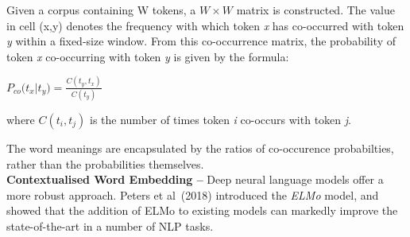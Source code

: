 \documentclass[12pt,a4paper]{article}
\begin{document}
Given a corpus containing W tokens, a $W \times W$ matrix is constructed. The value in cell (x,y) denotes the frequency with which token \textit{x} has co-occurred with token \textit{y} within a fixed-size window. From this co-occurrence matrix, the probability of token \textit{x} co-occurring with token \textit{y} is given by the formula: \begin{center}
	$P_{co}\bigl( t_x | t_y\bigr) = \frac{C(t_y, t_x)}{C(t_y)}$
\end{center}
where $C(t_i, t_j)$ is the number of times token \textit{i} co-occurs with token \textit{j}.

The word meanings are encapsulated by the ratios of co-occurence probabilties, rather than the probabilities themselves.\\
\newpage
\noindent \textbf{Contextualised Word Embedding --}
Deep neural language models offer a more robust approach. Peters et al\ (2018) \cite{peters2018deep} introduced the \textit{ELMo} model, and showed that the addition of ELMo to existing models can markedly improve the state-of-the-art in a number of NLP tasks.\\
\end{document}
